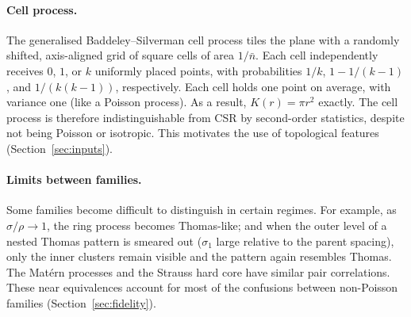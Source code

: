 \documentclass[twoside]{article}
\newcommand{\nb}{\bar n}
\begin{document}
\paragraph{Cell process.}
The generalised Baddeley--Silverman cell process tiles the plane with a randomly shifted, axis-aligned grid of square
cells of area $1/\nb$. Each cell independently receives $0$, $1$, or $k$ uniformly placed points, with probabilities $1/k$, $1-1/(k-1)$, and $1/(k(k-1))$, respectively. Each cell holds one point on average, with variance one (like a Poisson process). As a result, $K(r)=\pi r^2$ exactly. The cell process is therefore indistinguishable from CSR by second-order statistics, despite not being Poisson or isotropic. This motivates the use of topological features (Section~\ref{sec:inputs}).

\paragraph{Limits between families.}
Some families become difficult to distinguish in certain regimes. For example, as $\sigma/\rho \to 1$, the ring process becomes Thomas-like; and when the outer level of a nested Thomas pattern is smeared out ($\sigma_1$ large relative to the parent
spacing), only the inner clusters remain visible and the pattern again resembles Thomas. The Mat\'ern processes and the Strauss hard core have similar pair correlations. These near equivalences account for most of the confusions between non-Poisson families (Section~\ref{sec:fidelity}).
\end{document}

